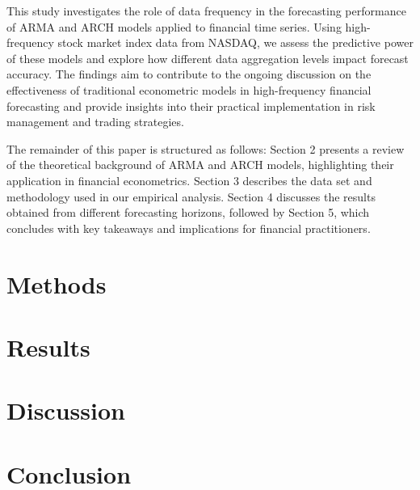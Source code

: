 \documentclass[a4paper, 12pt]{article}
\begin{document}
This study investigates the role of data frequency in the forecasting performance of ARMA and ARCH models applied to financial time series. Using high-frequency stock market index data from NASDAQ, we assess the predictive power of these models and explore how different data aggregation levels impact forecast accuracy. The findings aim to contribute to the ongoing discussion on the effectiveness of traditional econometric models in high-frequency financial forecasting and provide insights into their practical implementation in risk management and trading strategies.

The remainder of this paper is structured as follows: Section 2 presents a review of the theoretical background of ARMA and ARCH models, highlighting their application in financial econometrics. Section 3 describes the data set and methodology used in our empirical analysis. Section 4 discusses the results obtained from different forecasting horizons, followed by Section 5, which concludes with key takeaways and implications for financial practitioners.


\part{Methods}


\part{Results}


\part{Discussion}



\part{Conclusion}
\end{document}
